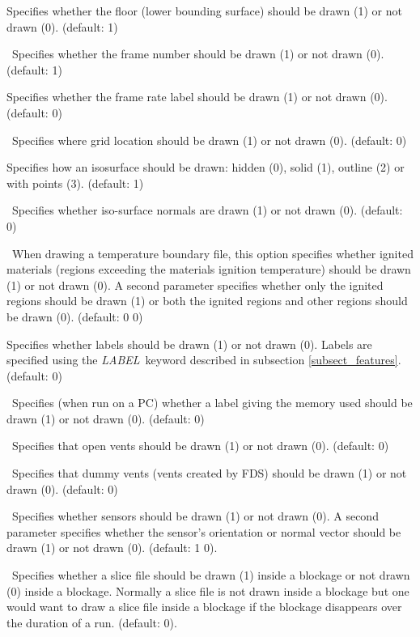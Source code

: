 \documentclass[11pt,twoside]{book}
\begin{document}
Specifies whether
the floor (lower bounding surface) should be drawn (1) or not drawn
(0).
(default: 1)

\ Specifies whether the frame number
should be drawn (1) or not drawn (0). (default: 1)

Specifies whether
the frame rate label should be drawn (1) or not drawn (0).
(default: 0)

\ Specifies where grid location should be drawn (1) or not
drawn (0). (default: 0)

Specifies how an isosurface should be drawn: hidden (0),
solid (1), outline (2) or with points (3).  (default: 1)

\ Specifies whether iso-surface normals are drawn
(1) or not drawn (0).  (default: 0)

\ When drawing a temperature boundary file, this option
specifies whether ignited materials (regions exceeding the materials
ignition temperature) should be drawn (1) or not drawn (0).
A second parameter specifies whether only the ignited regions
should be drawn (1) or both the ignited regions and other regions should be drawn (0).
(default: 0 0)


Specifies whether labels should be drawn (1) or
not drawn (0).  Labels are specified using the {\em LABEL}\
keyword described in subsection \ref{subsect_features}. (default:
0)

\ Specifies (when run on a PC) whether a label
giving the memory used should be drawn (1) or not drawn (0).
(default: 0)

\ Specifies that open vents should be drawn
(1) or not drawn (0).  (default: 0)

\ Specifies that dummy vents (vents created
by FDS) should be drawn (1) or not drawn (0).  (default: 0)

\ Specifies whether sensors should be drawn (1) or not drawn (0).
A second parameter specifies whether the sensor's orientation or normal vector
should be drawn (1) or not drawn (0). (default: 1 0).

\ Specifies whether a slice file should be drawn (1) inside
a blockage or not drawn (0) inside a blockage.  Normally a slice file
is not drawn inside a blockage but one would want to draw a
slice file inside a blockage if the blockage disappears over the
duration of a run.  (default: 0).
\end{document}
